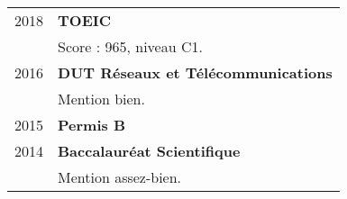 \begin{supertabular}{rl}
    \textsc{2018} & \textbf{TOEIC}\\
    & Score : 965, niveau C1.\\[1.5ex]
    \textsc{2016} & \textbf{DUT R\'eseaux et T\'el\'ecommunications}\\
    & Mention bien.\\[1.5ex]
    \textsc{2015} & \textbf{Permis B}\\[1.5ex]
    \textsc{2014} & \textbf{Baccalaur\'eat Scientifique}\\
    & Mention assez-bien.\\
\end{supertabular}

\medskip

